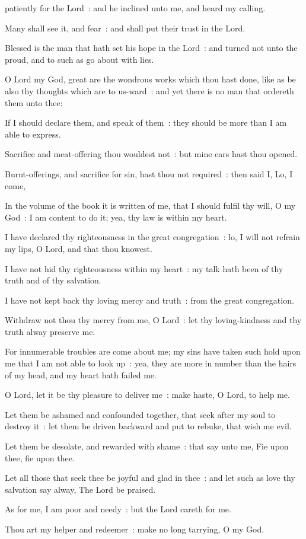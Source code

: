  patiently for the Lord~: and he inclined unto me, and heard my calling.\par
{}
Many shall see it, and fear~: and shall put their trust in the Lord.\par
{}Blessed is the man that hath set his hope in the Lord~: and turned not unto the proud, and to such as go about with lies.\par
{}O Lord my God, great are the wondrous works which thou hast done, like as be also thy thoughts which are to us-ward~: and yet there is no man that ordereth them unto thee:\par
{}If I should declare them, and speak of them~: they should be more than I am able to express.\par
{}Sacrifice and meat-offering thou wouldest not~: but mine ears hast thou opened.\par
{}Burnt-offerings, and sacrifice for sin, hast thou not required~: then said I, Lo, I come,\par
{}In the volume of the book it is written of me, that I should fulfil thy will, O my God~: I am content to do it; yea, thy law is within my heart.\par
{}I have declared thy righteousness in the great congregation~: lo, I will not refrain my lips, O Lord, and that thou knowest.\par
{}I have not hid thy righteousness within my heart~: my talk hath been of thy truth and of thy salvation.\par
{}I have not kept back thy loving mercy and truth~: from the great congregation.\par
{}Withdraw not thou thy mercy from me, O Lord~: let thy loving-kindness and thy truth alway preserve me.\par
{}For innumerable troubles are come about me; my sins have taken such hold upon me that I am not able to look up~: yea, they are more in number than the hairs of my head, and my heart hath failed me.\par
{}O Lord, let it be thy pleasure to deliver me~: make haste, O Lord, to help me.\par
{}Let them be ashamed and confounded together, that seek after my soul to destroy it~: let them be driven backward and put to rebuke, that wish me evil.\par
{}Let them be desolate, and rewarded with shame~: that say unto me, Fie upon thee, fie upon thee.\par
{}Let all those that seek thee be joyful and glad in thee~: and let such as love thy salvation say alway, The Lord be praised.\par
{}As for me, I am poor and needy~: but the Lord careth for me.\par
{}Thou art my helper and redeemer~: make no long tarrying, O my God.\par

